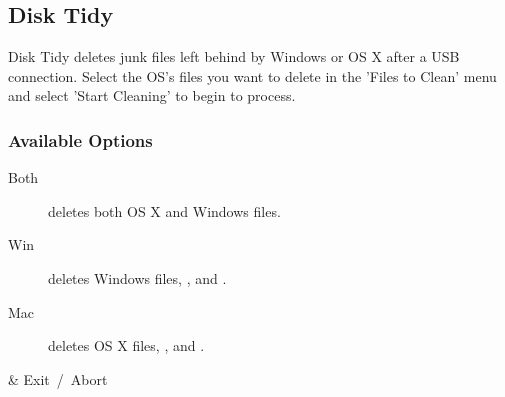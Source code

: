 \subsection{Disk Tidy}
  Disk Tidy deletes junk files left behind by Windows or OS X after a USB connection.
  Select the OS's files you want to delete in the 'Files to Clean' menu and select 'Start Cleaning' to begin to process.

  \subsubsection{Available Options}
  \begin{description}
    \item[Both] deletes both OS X and Windows files.
    \item[Win] deletes Windows files, ,  and
      .
    \item[Mac] deletes OS X files, ,  and
      .
  \end{description}
  
  \begin{table}
    \begin{btnmap}{}{}
      & Exit\ /\ Abort\\
    \end{btnmap}
\end{table}
